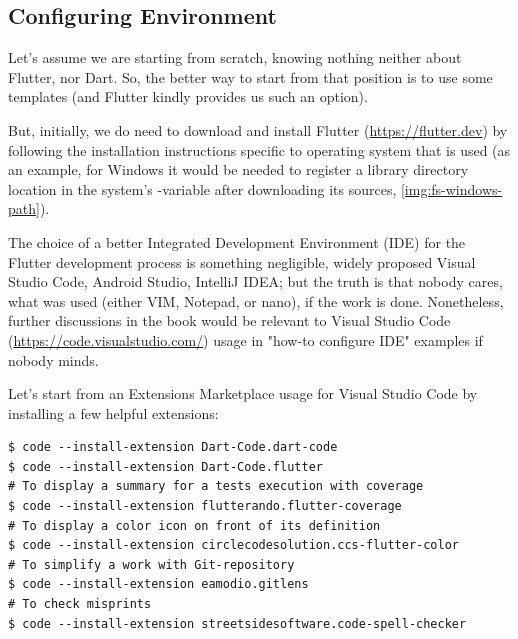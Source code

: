 
\subsection{Configuring Environment} \label{first-step}

Let's assume we are starting from scratch, knowing nothing neither about Flutter, nor Dart. So, the better way to start
from that position is to use some templates (and Flutter kindly provides us such an option).

But, initially, we do need to download and install Flutter (\href{https://flutter.dev}{https://flutter.dev}) by
following the installation instructions specific to operating system that is used (as an example, for Windows it
would be needed to register a library directory location in the system's -variable after downloading its
sources, \cref{img:fs-windows-path}).


The choice of a better Integrated Development Environment (IDE) for the Flutter development process is something
negligible, widely proposed Visual Studio Code, Android Studio, IntelliJ IDEA; but the truth is that nobody cares,
what was used (either VIM, Notepad, or nano), if the work is done. Nonetheless, further discussions in the book would
be relevant to Visual Studio Code (\href{https://code.visualstudio.com/}{https://code.visualstudio.com/}) usage in
"how-to configure IDE" examples if nobody minds.

\noindent Let's start from an Extensions Marketplace usage for Visual Studio Code by installing a few helpful extensions:

\begin{lstlisting}[language=terminal]
$ code --install-extension Dart-Code.dart-code
$ code --install-extension Dart-Code.flutter
# To display a summary for a tests execution with coverage
$ code --install-extension flutterando.flutter-coverage
# To display a color icon on front of its definition
$ code --install-extension circlecodesolution.ccs-flutter-color
# To simplify a work with Git-repository
$ code --install-extension eamodio.gitlens
# To check misprints
$ code --install-extension streetsidesoftware.code-spell-checker
\end{lstlisting}

